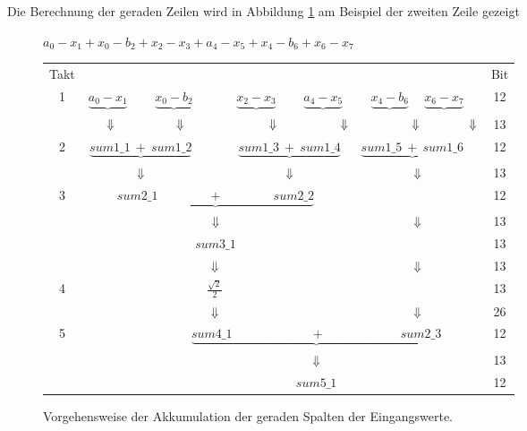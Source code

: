 Die Berechnung der geraden Zeilen wird in Abbildung \ref{pic:AkkumulationGeradeSpalten} am Beispiel der zweiten Zeile gezeigt
\begin{figure}[htbp]
 \centering
 $a_0 - x_1 + x_0 - b_2 + x_2 - x_3 + a_4 - x_5 + x_4 - b_6 + x_6 - x_7$\\

 \vspace{0.3cm}
 
\begin{tabular}{ccccccccccccc}
Takt&\multicolumn{11}{c}{}&Bit\\
1 &$\underbrace{a_0 - x_1}$ &        &$ \underbrace{x_0 - b_2}$ &  &$\underbrace{x_2 - x_3}$ &  &$\underbrace{a_4 - x_5}$ &  &$\underbrace{x_4 - b_6}$ &$\underbrace{x_6 - x_7}$& &12\\
  &\multicolumn{11}{l}{$\hspace{0.5cm} \Downarrow \hspace{1.75cm} \Downarrow \hspace{2.4cm} \Downarrow \hspace{1.8cm}\Downarrow \hspace{1.8cm}\Downarrow \hspace{1.4cm}\Downarrow$}&13\\
2 &\multicolumn{3}{c}{$\underbrace{sum1\_1 \: + \: sum1\_2}$} & & \multicolumn{3}{c}{$\underbrace{sum1\_3 \: + \: sum1\_4}$} &\multicolumn{3}{c}{$\: \underbrace{sum1\_5 \: + \: sum1\_6}$}& &12\\
  &\multicolumn{3}{c}{$\Downarrow$}  & & \multicolumn{3}{c}{$\Downarrow$} & & \multicolumn{2}{c}{$\Downarrow$}& &13\\
3 &\multicolumn{7}{c}{$\underbrace{sum2\_1 \quad  \quad \quad \quad + \quad \quad \quad  \quad sum2\_2}$} & & & & &12\\
  &\multicolumn{7}{c}{$\Downarrow$}& & \multicolumn{2}{c}{$\Downarrow$}& &13\\
  &\multicolumn{7}{c}{$sum3\_1$}& & & & &13\\
  & & & & $\Downarrow$& & & & & \multicolumn{2}{c}{$\Downarrow$} & & 13\\
4 & & & & $\frac{\sqrt{2}}{2}$&\multicolumn{5}{c}{}& & &13\\
  & & & & $\Downarrow$& & & & & \multicolumn{2}{c}{$\Downarrow$ }& & 26\\
5 & & & \multicolumn{9}{c}{$\underbrace{sum4\_1 \:  \quad \quad \quad \quad \quad \quad + \quad \quad \quad \quad \quad \quad   sum2\_3}$} &12\\
  & & & \multicolumn{9}{c}{$\Downarrow$}&13\\
  & & & \multicolumn{9}{c}{$sum5\_1$}&12\\
\end{tabular}
\caption{Vorgehensweise der Akkumulation der geraden Spalten der Eingangswerte.}
\label{pic:AkkumulationGeradeSpalten}
\end{figure}

